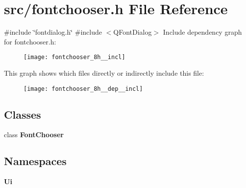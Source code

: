 \section{src/fontchooser.h File Reference}
\label{fontchooser_8h}
{\ttfamily \#include \char`\"{}fontdialog.\+h\char`\"{}}\newline
{\ttfamily \#include $<$Q\+Font\+Dialog$>$}\newline
Include dependency graph for fontchooser.\+h\+:\nopagebreak
\begin{figure}[H]
\begin{center}
\leavevmode
\texttt{[image: fontchooser\_8h\_\_incl]}
\end{center}
\end{figure}
This graph shows which files directly or indirectly include this file\+:\nopagebreak
\begin{figure}[H]
\begin{center}
\leavevmode
\texttt{[image: fontchooser\_8h\_\_dep\_\_incl]}
\end{center}
\end{figure}
\subsection*{Classes}
\begin{DoxyCompactItemize}
\item 
class \textbf{ Font\+Chooser}
\end{DoxyCompactItemize}
\subsection*{Namespaces}
\begin{DoxyCompactItemize}
\item 
 \textbf{ Ui}
\end{DoxyCompactItemize}
